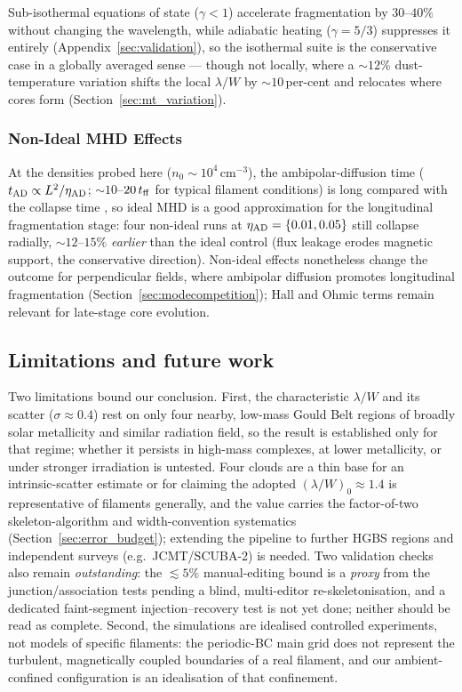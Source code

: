 \documentclass[usenatbib,twoside,twocolumn]{mnras}
\begin{document}
Sub-isothermal equations of state ($\gamma<1$) accelerate fragmentation by $30$--$40\%$ without changing the wavelength, while adiabatic heating ($\gamma=5/3$) suppresses it entirely (Appendix~\ref{sec:validation}), so the isothermal suite is the conservative case in a globally averaged sense --- though not locally, where a $\sim12\%$ dust-temperature variation shifts the local $\lambda/W$ by $\sim10$\,per-cent and relocates where cores form (Section~\ref{sec:mt_variation}).

\subsubsection{Non-Ideal MHD Effects}
\label{sec:nonideal}

At the densities probed here ($n_0\sim10^4$\,cm$^{-3}$), the ambipolar-diffusion time ($t_{\rm AD}\propto L^2/\eta_{\rm AD}$; $\sim10$--$20\,t_{\rm ff}$ for typical filament conditions) is long compared with the collapse time \citep{Tassis2004}, so ideal MHD is a good approximation for the longitudinal fragmentation stage: four non-ideal runs at $\eta_{\rm AD}=\{0.01,0.05\}$ still collapse radially, $\sim12$--$15\%$ \textit{earlier} than the ideal control (flux leakage erodes magnetic support, the conservative direction). Non-ideal effects nonetheless change the outcome for perpendicular fields, where ambipolar diffusion promotes longitudinal fragmentation (Section~\ref{sec:modecompetition}); Hall and Ohmic terms remain relevant for late-stage core evolution.

\subsection{Limitations and future work}
\label{sec:limitations}

Two limitations bound our conclusion. First, the characteristic $\lambda/W$ and its scatter ($\sigma\approx0.4$) rest on only four nearby, low-mass Gould Belt regions of broadly solar metallicity and similar radiation field, so the result is established only for that regime; whether it persists in high-mass complexes, at lower metallicity, or under stronger irradiation is untested. Four clouds are a thin base for an intrinsic-scatter estimate or for claiming the adopted $(\lambda/W)_0\approx1.4$ is representative of filaments generally, and the value carries the factor-of-two skeleton-algorithm and width-convention systematics (Section~\ref{sec:error_budget}); extending the pipeline to further HGBS regions and independent surveys (e.g.\ JCMT/SCUBA-2) is needed. Two validation checks also remain \emph{outstanding}: the $\lesssim5\%$ manual-editing bound is a \emph{proxy} from the junction/association tests pending a blind, multi-editor re-skeletonisation, and a dedicated faint-segment injection--recovery test is not yet done; neither should be read as complete. Second, the simulations are idealised controlled experiments, not models of specific filaments: the periodic-BC main grid does not represent the turbulent, magnetically coupled boundaries of a real filament, and our ambient-confined configuration is an idealisation of that confinement.
\end{document}
